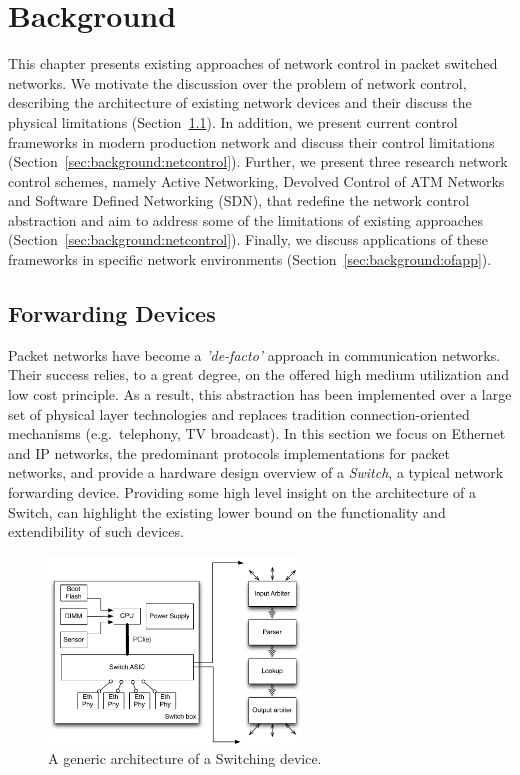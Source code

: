 \chapter{Background} \label{ch:background}
\ifpdf
    \graphicspath{{Background/BackgroundFigs/PNG/}{Chapter3/BackgroundFigs/PDF/}{Background/BackgroundFigs/}}
\else
    \graphicspath{{Background/BackgroundFigs/EPS/}{Background/BackgroundFigs/}}
\fi

This chapter presents existing approaches of network control in packet switched
networks.  We motivate the discussion over the problem of network control,
describing the architecture of existing network devices and their discuss the physical
limitations (Section~\ref{sec:background:forwarding}). In addition, we present
current control frameworks in modern production network and discuss their
control limitations (Section~\ref{sec:background:netcontrol}). Further, we
present three research network control schemes, namely Active Networking,
Devolved Control of ATM Networks and Software Defined Networking (SDN), that redefine the network
control abstraction and aim to address some of the limitations of existing
approaches (Section~\ref{sec:background:netcontrol}).  Finally, we discuss
applications of these frameworks in specific network environments
(Section~\ref{sec:background:ofapp}).

\section{Forwarding Devices} \label{sec:background:forwarding}

Packet networks have become a \emph{'de-facto'} approach in communication
networks. Their success relies, to a great degree, on the offered high medium
utilization and low cost principle.  As a result, this abstraction has been
implemented over a large set of physical layer technologies and replaces
tradition connection-oriented mechanisms (e.g.~telephony, TV broadcast). In this
section we focus on Ethernet and IP networks, the predominant protocols
implementations for packet networks, and provide a hardware design overview
of a \emph{Switch}, a typical network forwarding device. 
Providing some high level insight on the architecture of a Switch, can
highlight the existing lower bound on the functionality and extendibility of
such devices. 

\begin{figure}
\includegraphics[width=0.6\textwidth]{switch_design}
\caption{A generic architecture of a Switching device.}
\label{fig:background:switch_design}
\end{figure}

